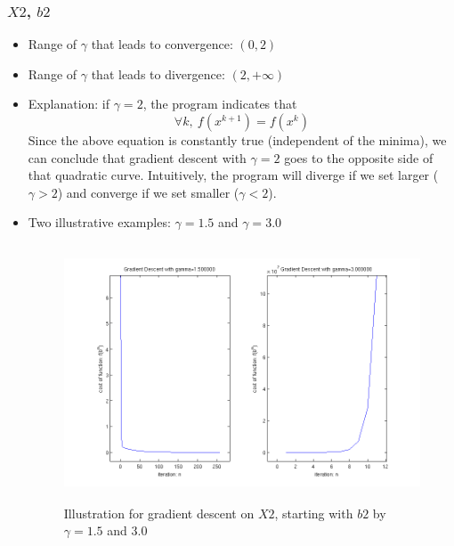 \documentclass[11pt,a4paper]{article}
\begin{document}
\subsubsection{$X2$, $b2$}
\begin{itemize}
    \item Range of $\gamma$ that leads to convergence: $(0,2)$
    \item Range of $\gamma$ that leads to divergence: $(2,+\infty)$
    \item Explanation: if $\gamma = 2$, the program indicates that 
        $$ \forall k,\ f(x^{k+1}) = f(x^{k})$$ 
        Since the above equation is constantly true (independent of the
        minima), we can conclude that gradient descent with $\gamma = 2$ goes 
        to the opposite side of that quadratic curve. Intuitively, the program 
        will diverge if we set larger ($\gamma>2$) and converge if we set smaller
        ($\gamma<2$).
    \item Two illustrative
        examples: $\gamma = 1.5$ and $\gamma = 3.0$
        \begin{figure}[h]
            \centering
            \includegraphics[width=6in,height=3in]{../ps1_matlab/2.png}
            \caption{Illustration for gradient descent on $X2$, starting with
                $b2$ by $\gamma = 1.5$ and $3.0$}
        \end{figure}
\end{itemize}

\newpage
\end{document}
